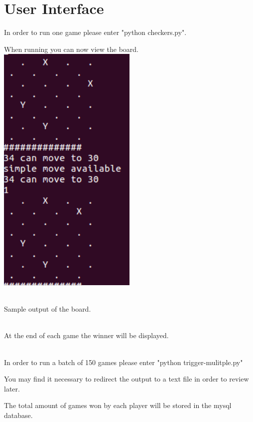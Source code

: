 \documentclass{article}
\begin{document}
\section{User Interface}
\begin{description}
In order to run one game please enter "python checkers.py".

When running you can now view the board. \\
\includegraphics[width=0.5\textwidth]{Selection_002} %
\caption{\\Sample output of the board.}

\\ At the end of each game the winner will be displayed.



\\In order to run a batch of 150 games please enter "python trigger-mulitple.py"

You may find it necessary to redirect the output to a text file in order to review later.

The total amount of games won by each player will be stored in the mysql database.
\end{description} 
\end{document}
